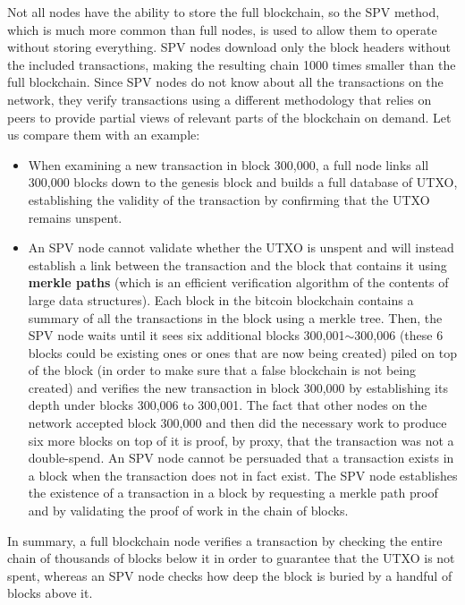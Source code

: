 \documentclass{article}
\begin{document}
    Not all nodes have the ability to store the full blockchain, so the SPV method, which is much more common than full nodes, is used to allow them to operate without storing everything. SPV nodes download only the block headers without the included transactions, making the resulting chain 1000 times smaller than the full blockchain. Since SPV nodes do not know about all the transactions on the network, they verify transactions using a different methodology that relies on peers to provide partial views of relevant parts of the blockchain on demand. Let us compare them with an example:

    \begin{itemize}
      \item When examining a new transaction in block 300,000, a full node links all 300,000 blocks down to the genesis block and builds a full database of UTXO, establishing the validity of the transaction by confirming that the UTXO remains unspent.
      \item An SPV node cannot validate whether the UTXO is unspent and will instead establish a link between the transaction and the block that contains it using \textbf{merkle paths} (which is an efficient verification algorithm of the contents of large data structures). Each block in the bitcoin blockchain contains a summary of all the transactions in the block using a merkle tree. Then, the SPV node waits until it sees six additional blocks 300,001$\sim$300,006 (these 6 blocks could be existing ones or ones that are now being created) piled on top of the block (in order to make sure that a false blockchain is not being created) and verifies the new transaction in block 300,000 by establishing its depth under blocks 300,006 to 300,001. The fact that other nodes on the network accepted block 300,000 and then did the necessary work to produce six more blocks on top of it is proof, by proxy, that the transaction was not a double-spend. An SPV node cannot be persuaded that a transaction exists in a block when the transaction does not in fact exist. The SPV node establishes the existence of a transaction in a block by requesting a merkle path proof and by validating the proof of work in the chain of blocks.
    \end{itemize}

    In summary, a full blockchain node verifies a transaction by checking the entire chain of thousands of blocks below it in order to guarantee that the UTXO is not spent, whereas an SPV node checks how deep the block is buried by a handful of blocks above it.
\end{document}
